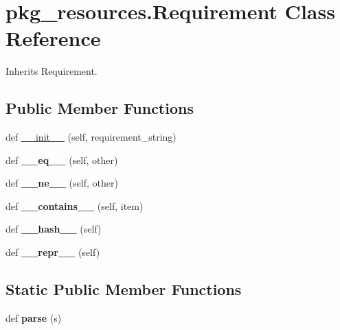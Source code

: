 \hypertarget{classpkg__resources_1_1_requirement}{}\section{pkg\+\_\+resources.\+Requirement Class Reference}
\label{classpkg__resources_1_1_requirement}


Inherits Requirement.

\subsection*{Public Member Functions}
\begin{DoxyCompactItemize}
\item 
def \hyperlink{classpkg__resources_1_1_requirement_aeb1ecd04ffa958c098eaa2b163d06831}{\+\_\+\+\_\+init\+\_\+\+\_\+} (self, requirement\+\_\+string)
\item 
\mbox{\label{classpkg__resources_1_1_requirement_a987a18e8b60f9fa271f97df50be53376}} 
def {\bfseries \+\_\+\+\_\+eq\+\_\+\+\_\+} (self, other)
\item 
\mbox{\label{classpkg__resources_1_1_requirement_ae1a6416c370d129ced1a755fa0ecdc86}} 
def {\bfseries \+\_\+\+\_\+ne\+\_\+\+\_\+} (self, other)
\item 
\mbox{\label{classpkg__resources_1_1_requirement_aa4224c601acda9e7d94018e5d6a6350f}} 
def {\bfseries \+\_\+\+\_\+contains\+\_\+\+\_\+} (self, item)
\item 
\mbox{\label{classpkg__resources_1_1_requirement_aa47dd60e7d032a4abefd829adb267459}} 
def {\bfseries \+\_\+\+\_\+hash\+\_\+\+\_\+} (self)
\item 
\mbox{\label{classpkg__resources_1_1_requirement_a806f8c125c4c9687c23f450e346da5f6}} 
def {\bfseries \+\_\+\+\_\+repr\+\_\+\+\_\+} (self)
\end{DoxyCompactItemize}
\subsection*{Static Public Member Functions}
\begin{DoxyCompactItemize}
\item 
\mbox{\label{classpkg__resources_1_1_requirement_a9be7f45af99c94ec9ca24807ecef986b}} 
def {\bfseries parse} (s)
\end{DoxyCompactItemize}
